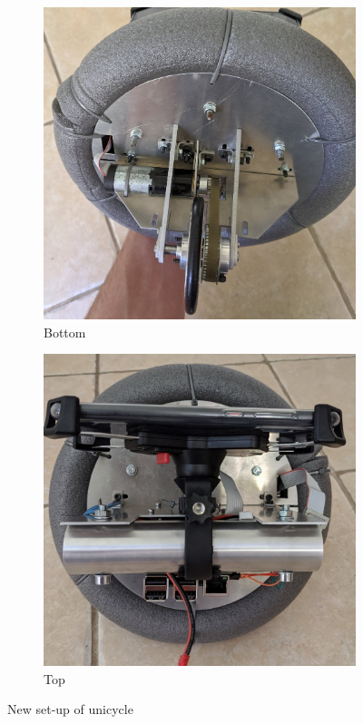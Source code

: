 \documentclass[twoside,twocolumn,12pt]{article}
\begin{document}
\begin{figure}[t!]
  \begin{subfigure}[t]{0.325\textwidth}
    \includegraphics[width=\linewidth]{botnew}
    \caption{Bottom}
  \label{sub:botnew}
  \end{subfigure}
  \begin{subfigure}[t]{0.325\textwidth}
    \includegraphics[width=\linewidth]{topnew}
    \caption{Top}
  \label{sub:topnew}
  \end{subfigure}
  
  \caption{New set-up of unicycle}
  \label{fig:new}
\end{figure}
\end{document}

